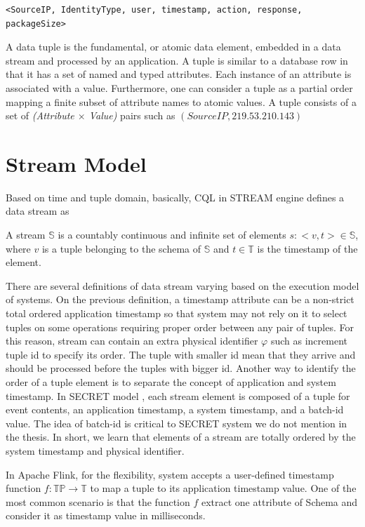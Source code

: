 \begin{verbatim}
<SourceIP, IdentityType, user, timestamp, action, response, packageSize>
\end{verbatim}

A data tuple is the fundamental, or atomic data element, embedded in a data stream and processed by an application. A tuple is similar to a database row in that it has a set of named and typed attributes. Each instance of an attribute is associated with a value\citep{Henrique:2014}. Furthermore, one can consider a tuple as a partial order mapping a finite subset of attribute names to atomic values\citep{Petit:2012}. A tuple consists of a set of \textit{(Attribute $\times$ Value)} pairs such as $(SourceIP, 219.53.210.143)$


\section{Stream Model}


Based on time and tuple domain, basically, CQL in STREAM engine\citep{Arasu:2006:CCQ} defines a data stream as
\begin{defi}
	A stream $\mathbb{S}$ is a countably continuous and infinite set of elements $s:<v,t> \in \mathbb{S}$, where $v$ is a tuple belonging to the schema of $\mathbb{S}$ and $t \in \mathbb{T}$ is the timestamp of the element. 
\end{defi}

There are several definitions of data stream varying based on the execution model of systems. On the previous definition, a timestamp attribute can be a non-strict total ordered application timestamp so that system may not rely on it to select tuples on some operations requiring proper order between any pair of tuples. For this reason, stream can contain an extra physical identifier  $\varphi$ \citep{Petit:2010} such as increment tuple id to specify its order. The tuple with smaller id mean that they arrive and should be processed before the tuples with bigger id. Another way to identify the order of a tuple element is to separate the concept of application and system timestamp. In SECRET model \citep{Dindar:2013}, each stream element is composed of a tuple for event contents, an application timestamp, a system timestamp, and a batch-id value. The idea of batch-id is critical to SECRET system we do not mention in the thesis.
In short, we learn that elements of a stream are totally ordered by the system timestamp and physical identifier.

In Apache Flink, for the flexibility, system accepts a user-defined timestamp function   $f: \mathbb{TP} \rightarrow \mathbb{T}$ to map a tuple to its application timestamp value. One of the most common scenario is that the function $f$ extract one attribute of Schema and consider it as timestamp value in milliseconds.

